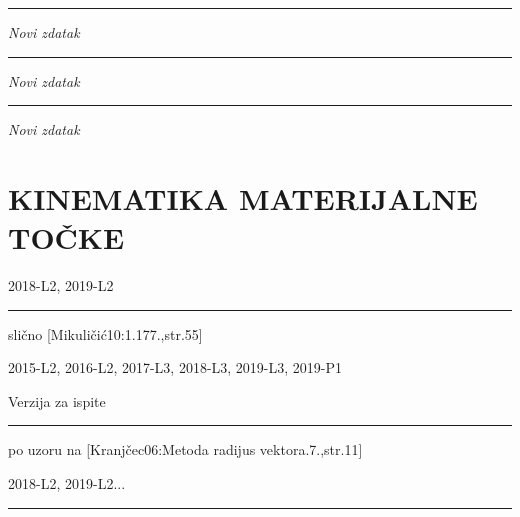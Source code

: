 \documentclass[10pt]{book}
\newcounter{zadatak} %
\newcounter{cjelina}
\begin{document}
{\color{boja} \rule{\linewidth}{0.3mm} }
 \textit{Novi zdatak}


\vspace{0.2cm}



\vspace{0.2cm} 


{\color{boja} \rule{\linewidth}{0.3mm} }

\textit{Novi zdatak}

\vspace{0.2cm}



\vspace{0.2cm} 


{\color{boja} \rule{\linewidth}{0.3mm} }

\textit{Novi zdatak}

\vspace{0.2cm}



\vspace{0.2cm} 


\newpage
\chapter{KINEMATIKA MATERIJALNE TOČKE}
\setcounter{zadatak}{0}



2018-L2, 2019-L2

\vspace{0.2cm}

{\color{boja} \rule{\linewidth}{0.3mm} }


 slično [Mikuličić10:1.177.,str.55]

2015-L2, 2016-L2, 2017-L3, 2018-L3, 2019-L3, 2019-P1


Verzija za ispite

\vspace{0.2cm}

{\color{boja} \rule{\linewidth}{0.3mm} }


 po uzoru na [Kranjčec06:Metoda radijus vektora.7.,str.11]

2018-L2, 2019-L2...

\vspace{0.2cm}

{\color{boja} \rule{\linewidth}{0.3mm} }
\end{document}
